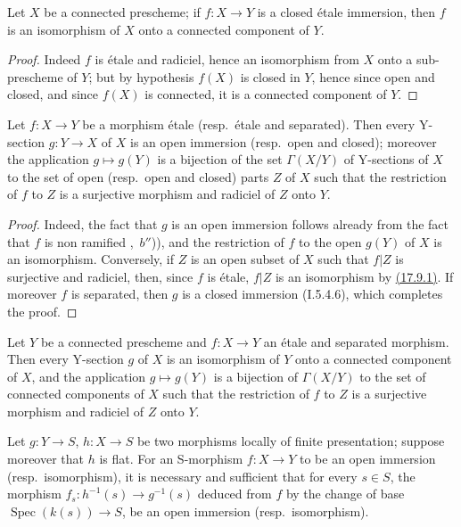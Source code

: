 \begin{corollary}[17.9.2]
\label{IV.17.9.2}
Let $X$ be a connected prescheme; if $f:X\to Y$ is a closed \'etale immersion, then $f$ is an isomorphism of $X$ onto a connected component of $Y$.
\end{corollary}

\begin{proof}
Indeed $f$ is \'etale and radiciel, hence an isomorphism from $X$ onto a sub-prescheme of $Y$; but by hypothesis $f(X)$ is closed in $Y$, hence since open and closed, and since $f(X)$ is connected, it is a connected component of $Y$.
\end{proof}


\begin{corollary}[17.9.3]
\label{IV.17.9.3}
Let $f:X\to Y$ be a morphism \'etale (resp.\ \'etale and separated).
Then every Y-section $g:Y\to X$ of $X$ is an open immersion (resp.\ open and closed); moreover the application $g\mapsto g(Y)$ is a bijection of the set $\Gamma(X/Y)$ of Y-sections of $X$ to the set of open (resp.\ open and closed) parts $Z$ of $X$ such that the restriction of $f$ to $Z$ is a surjective morphism and radiciel of $Z$ onto $Y$.
\end{corollary}

\begin{proof}
Indeed, the fact that $g$ is an open immersion follows already from the fact that $f$ is non ramified ,~$b''$)), and the restriction of $f$ to the open $g(Y)$ of $X$ is an isomorphism.
Conversely, if $Z$ is an open subset of $X$ such that $f|Z$ is surjective and radiciel, then, since $f$ is \'etale, $f|Z$ is an isomorphism by {\hyperlink{ega4.c04.thm.17-9-1}{(17.9.1)}}.
If moreover $f$ is separated, then $g$ is a closed immersion (I.5.4.6), which completes the proof.
\end{proof}

\begin{corollary}[17.9.4]
\label{IV.17.9.4}
Let $Y$ be a connected prescheme and $f:X\to Y$ an \'etale and separated morphism.
Then every Y-section $g$ of $X$ is an isomorphism of $Y$ onto a connected component of $X$, and the application $g\mapsto g(Y)$ is a bijection of $\Gamma(X/Y)$ to the set of connected components of $X$ such that the restriction of $f$ to $Z$ is a surjective morphism and radiciel of $Z$ onto $Y$.
\end{corollary}

\begin{corollary}[17.9.5]
\label{IV.17.9.5}
Let $g:Y\to S$, $h:X\to S$ be two morphisms locally of finite presentation; suppose moreover that $h$ is flat.
For an S-morphism $f:X\to Y$ to be an open immersion (resp.\ isomorphism), it is necessary and sufficient that for every $s\in S$, the morphism $f_s:h^{-1}(s)\to g^{-1}(s)$ deduced from $f$ by the change of base $\operatorname{Spec}(k(s))\to S$, be an open immersion (resp.\ isomorphism).
\end{corollary}

